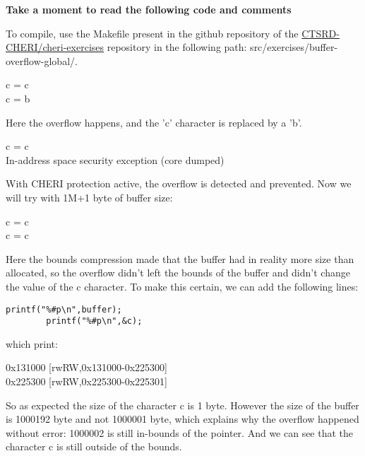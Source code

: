 \documentclass[a4paper, 11pt]{article}
\begin{document}
	\textbf{Take a moment to read the following code and comments}
	



	To compile, use the Makefile present in the github repository of the \href{https://github.com/CTSRD-CHERI/cheri-exercises}{CTSRD-CHERI/cheri-exercises} repository in the following path: src/exercises/buffer-overflow-global/. 
	
	\begin{tcolorbox}[colback=gray!5!white, colframe=gray!75!black, title=Output on a classic \Gls{risc-v} environment (no CHERI Protection)]
	c = c\\
	c = b
	\end{tcolorbox}
	Here the overflow happens, and the 'c' character is replaced by a 'b'.\break

	\begin{tcolorbox}[colback=gray!5!white, colframe=blue!75!black, title=Output On an environment protected by CHERI]
		c = c\\
		In-address space security exception (core dumped)
	\end{tcolorbox}
	With CHERI protection active, the overflow is detected and prevented.
	Now we will try with 1M+1 byte of buffer size:
	\begin{tcolorbox}[colback=gray!5!white, colframe=blue!75!black, title=Output On an environment protected by CHERI]
		c = c\\
		c = c
	\end{tcolorbox}
	Here the bounds compression made that the buffer had in reality more size than allocated, so the overflow didn't left the bounds of the buffer and didn't change the value of the c character.
	To make this certain, we can add the following lines:

	\begin{lstlisting}[caption=Example C Code]
	printf("%#p\n",buffer);
    	printf("%#p\n",&c);
	\end{lstlisting}
	which print:
	\begin{tcolorbox}[colback=gray!5!white, colframe=blue!75!black, title=Output On an environment protected by CHERI]
	0x131000 [rwRW,0x131000-0x225300]\\
	0x225300 [rwRW,0x225300-0x225301]
	\end{tcolorbox}
	So as expected the size of the character c is 1 byte. However the size of the buffer is 1000192 byte and not 1000001 byte, which explains why the  overflow happened without error: 1000002 is still in-bounds of the pointer. And we can see that the character c is still outside of the bounds.
	
\end{document}
